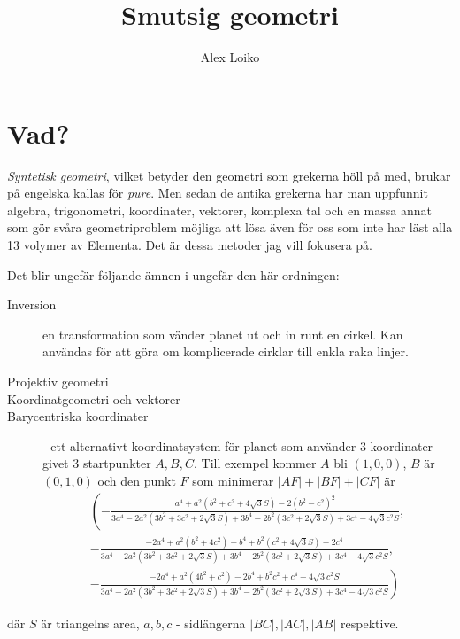 

\title{Smutsig geometri}
\author{Alex Loiko}



\maketitle

\section{Vad?}
\textit{Syntetisk geometri}, vilket betyder den geometri som grekerna höll på med,
brukar på engelska kallas för \textit{pure}. Men sedan de antika grekerna 
har man uppfunnit
algebra, trigonometri, koordinater, vektorer, komplexa tal och en massa annat som 
gör svåra geometriproblem möjliga att lösa även för oss som inte har 
läst alla 13 volymer av Elementa. Det är dessa metoder jag vill fokusera på.

Det blir ungefär följande ämnen i ungefär den här ordningen:
\begin{description}
\item[Inversion] en transformation som vänder planet ut och in runt en cirkel.
    Kan användas för att göra om komplicerade cirklar till enkla raka linjer.

\item[Projektiv geometri] %

\item[Koordinatgeometri och vektorer] 

\item[Barycentriska koordinater] - ett alternativt koordinatsystem för planet 
som använder $3$ koordinater givet $3$ startpunkter $A, B, C$. Till exempel
kommer $A$ bli $(1, 0, 0)$, $B$ är $(0, 1, 0)$ och 
den punkt $F$ som minimerar $|AF|+|BF|+|CF|$ är
\begin{eqnarray*}
\left(-\frac{a^4+a^2 \left(b^2+c^2+4 \sqrt{3} S\right)-2 \left(b^2-c^2\right)^2}{3 a^4-2 a^2 \left(3 b^2+3 c^2+2 \sqrt{3} S\right)+3 b^4-2 b^2 \left(3 c^2+2 \sqrt{3} S\right)+3 c^4-4 \sqrt{3} c^2 S},\right.\\
-\frac{-2 a^4+a^2 \left(b^2+4 c^2\right)+b^4+b^2 \left(c^2+4 \sqrt{3} S\right)-2 c^4}{3 a^4-2 a^2 \left(3 b^2+3 c^2+2 \sqrt{3} S\right)+3 b^4-2 b^2 \left(3 c^2+2 \sqrt{3} S\right)+3 c^4-4 \sqrt{3} c^2 S},\\
\left.-\frac{-2 a^4+a^2 \left(4 b^2+c^2\right)-2 b^4+b^2 c^2+c^4+4 \sqrt{3} c^2 S}{3 a^4-2 a^2 \left(3 b^2+3 c^2+2 \sqrt{3} S\right)+3 b^4-2 b^2 \left(3 c^2+2 \sqrt{3} S\right)+3 c^4-4 \sqrt{3} c^2 S}\right)
\end{eqnarray*}
\end{description}
där $S$ är triangelns area, $a,b,c$ - sidlängerna $|BC|, |AC|, |AB|$ respektive.


